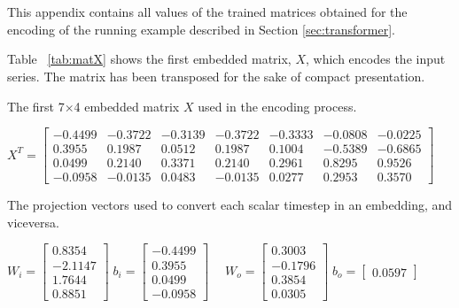 \documentclass[algorithms,article,submit,pdftex,moreauthors]{Definitions/mdpi}
\begin{document}
\appendixstart
\appendix
\section[\appendixname~\thesection]{} \label{sec:appendix}
This appendix contains all values of the trained matrices obtained for the encoding of the running example described in Section \ref{sec:transformer}.

\noindent Table ~\ref{tab:matX} shows the first embedded matrix, $X$, which encodes the input series. The matrix has been transposed for the sake of compact presentation.

\begin{table}[ht]
	\centering
	\caption{The first 7$\times$4 embedded matrix $X$ used in the encoding process.}
	\label{tab:matX}
	$
	X^T =	\begin{bmatrix}
-0.4499 & -0.3722 & -0.3139 & -0.3722 & -0.3333 & -0.0808 & -0.0225 \\
 0.3955 &  0.1987 &  0.0512 &  0.1987 &  0.1004 & -0.5389 & -0.6865 \\
 0.0499 &  0.2140 &  0.3371 &  0.2140 &  0.2961 &  0.8295 &  0.9526 \\
-0.0958 & -0.0135 &  0.0483 & -0.0135 &  0.0277 &  0.2953 &  0.3570
\end{bmatrix}
	$
\end{table}

\begin{table}[ht]
	\centering
	\caption{The projection vectors used to convert each scalar timestep in an embedding, and viceversa.}
	\label{tab:seca}
	$
	W_i = 	\begin{bmatrix}
				0.8354 \\
				-2.1147 \\
				1.7644 \\
				0.8851
			\end{bmatrix} \;
	b_i = 	\begin{bmatrix}
				-0.4499 \\  0.3955 \\  0.0499 \\ -0.0958
			\end{bmatrix} \quad\;
	W_o = 	\begin{bmatrix}
				 0.3003 \\ -0.1796 \\  0.3854 \\  0.0305
			\end{bmatrix} \;
	b_o = 	\begin{bmatrix}
				0.0597
			\end{bmatrix}
	$
\end{table}
\end{document}

